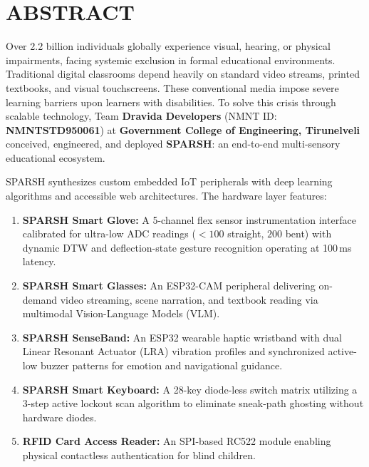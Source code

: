 \documentclass[12pt,a4paper]{report}
\begin{document}
\clearpage
{}
\setcounter{page}{2}

\chapter*{ABSTRACT}

Over 2.2 billion individuals globally experience visual, hearing, or physical impairments, facing systemic exclusion in formal educational environments. Traditional digital classrooms depend heavily on standard video streams, printed textbooks, and visual touchscreens. These conventional media impose severe learning barriers upon learners with disabilities. To solve this crisis through scalable technology, Team \textbf{Dravida Developers} (NMNT ID: \textbf{NMNTSTD950061}) at \textbf{Government College of Engineering, Tirunelveli} conceived, engineered, and deployed \textbf{SPARSH}: an end-to-end multi-sensory educational ecosystem.

SPARSH synthesizes custom embedded IoT peripherals with deep learning algorithms and accessible web architectures. The hardware layer features:
\begin{enumerate}
    \item \textbf{SPARSH Smart Glove:} A 5-channel flex sensor instrumentation interface calibrated for ultra-low ADC readings ($<100$ straight, $200$ bent) with dynamic DTW and deflection-state gesture recognition operating at 100\,ms latency.
    \item \textbf{SPARSH Smart Glasses:} An ESP32-CAM peripheral delivering on-demand video streaming, scene narration, and textbook reading via multimodal Vision-Language Models (VLM).
    \item \textbf{SPARSH SenseBand:} An ESP32 wearable haptic wristband with dual Linear Resonant Actuator (LRA) vibration profiles and synchronized active-low buzzer patterns for emotion and navigational guidance.
    \item \textbf{SPARSH Smart Keyboard:} A 28-key diode-less switch matrix utilizing a 3-step active lockout scan algorithm to eliminate sneak-path ghosting without hardware diodes.
    \item \textbf{RFID Card Access Reader:} An SPI-based RC522 module enabling physical contactless authentication for blind children.
\end{enumerate}
\end{document}
